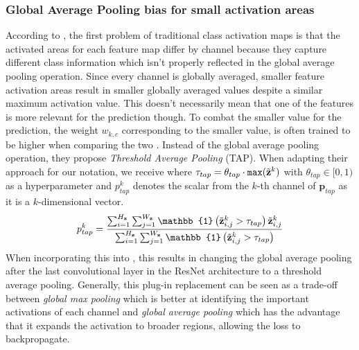 \subsubsection{Global Average Pooling bias for small activation areas}
According to \citet{Bae2020RethinkingCAM}, the first problem of traditional class activation maps is that the activated areas for each feature map differ by channel because they capture different class information which isn't properly reflected in the global average pooling operation. Since every channel is globally averaged, smaller feature activation areas result in smaller globally averaged values despite a similar maximum activation value. This doesn't necessarily mean that one of the features is more relevant for the prediction though. To combat the smaller value for the prediction, the weight $w_{k,c}$ corresponding to the smaller value, is often trained to be higher when comparing the two \citep{Bae2020RethinkingCAM}. Instead of the global average pooling operation, they propose \emph{Threshold Average Pooling} (TAP). When adapting their approach for our notation, we receive  where $\tau_{t a p} = \theta_{tap} \cdot \mathtt{max}(\Tilde{\mathbf{z}}^k)$ with $\theta_{tap} \in [0,1)$ as a hyperparameter and $p^k_{tap}$ denotes the scalar from the $k$-th channel of $\mathbf{p}_{tap}$ as it is a $k$-dimensional vector. 
\begin{equation}
\label{eq:tap}
p^k_{tap} =\frac{\sum_{i=1}^{H_\mathbf{z}} \sum_{j=1}^{W_\mathbf{z}} \mathbb{1}\left(\Tilde{\mathbf{z}}^k_{i,j} > \tau_{t a p}\right) \Tilde{\mathbf{z}}^k_{i,j}}{\sum_{i=1}^{H_\mathbf{z}} \sum_{j=1}^{W_\mathbf{z}} \mathbb{1}\left(\Tilde{\mathbf{z}}^k_{i,j} > \tau_{t a p}\right)}
\end{equation}
When incorporating this into \divcam, this results in changing the global average pooling after the last convolutional layer in the ResNet architecture to a threshold average pooling. Generally, this plug-in replacement can be seen as a trade-off between \emph{global max pooling} which is better at identifying the important activations of each channel and \emph{global average pooling} which has the advantage that it expands the activation to broader regions, allowing the loss to backpropagate.

